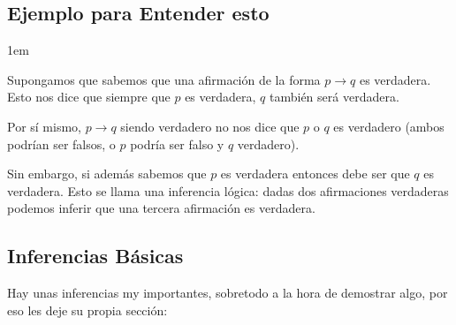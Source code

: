 \documentclass[12pt, fleqn]{report}                             %
\newenvironment{SmallIndentation}[1][0.75em]                    %
    {\begin{adjustwidth}{#1}{}\begin{footnotesize}}                 %
    {\end{footnotesize}\end{adjustwidth}}                           %
\begin{document}
            \subsection{Ejemplo para Entender esto}

                \begin{SmallIndentation}[1em]

                    Supongamos que sabemos que una afirmación de la forma $p \to q$ es verdadera.
                    Esto nos dice que siempre que $p$ es verdadera, $q$ también será verdadera. 

                    Por sí mismo, $p \to q$ siendo verdadero no nos dice que $p$ o $q$ es verdadero
                    (ambos podrían ser falsos, o $p$ podría ser falso y $q$ verdadero).

                    Sin embargo, si además sabemos que $p$ es verdadera entonces debe ser que $q$ es verdadera.
                    Esto se llama una inferencia lógica: dadas dos afirmaciones verdaderas podemos inferir
                    que una tercera afirmación es verdadera.
                
                \end{SmallIndentation}


            \clearpage
            \subsection{Inferencias Básicas}

                Hay unas inferencias my importantes, sobretodo a la hora de demostrar algo, por eso les
                deje su propia sección:
\end{document}
